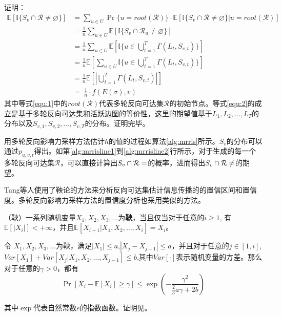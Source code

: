 证明：
\begin{align}
    \mathbb{E}[\mathbb{I}\{S_v\cap \mathcal{R} \ne \varnothing  \}] &=\sum_{u \in U}\Pr\{ u=root(\mathcal{R})\}\cdot \mathbb{E}[\mathbb{I}\{S_v \cap \mathcal{R}\ne\varnothing \}|u=root(\mathcal{R})] \label{equ:1} \\ 
    &= \frac{1}{n}\sum_{u \in U}\mathbb{E}[\mathbb{I}\{S_v \cap \mathcal{R}_u \ne \varnothing \}] \\ 
    &=  \frac{1}{n}\sum_{u \in U}\mathbb{E}\left[\mathbb{I}\{u\in \bigcup_{t=1}^{T}\Gamma(L_t,S_{v,t})\}\right]  \label{equ:2}\\ 
    &= \frac{1}{n} \mathbb{E}\left[\sum_{u \in U}\mathbb{I}\{u\in \bigcup_{t=1}^{T}\Gamma(L_t,S_{v,t})\}\right] \\ 
    &= \frac{1}{n}\mathbb{E}\left[\left|\bigcup_{t=1}^T\Gamma(L_t,S_{v,t})\right|\right] \\ 
    &=\ \frac{1}{n}\cdot f(E(\sigma),v)    
\end{align}
其中等式\ref{equ:1}中的$root(\mathcal{R})$代表多轮反向可达集$\mathcal{R}$的初始节点。等式\ref{equ:2}的成立是基于多轮反向可达集和活跃边图的等价性，这里的期望值基于$L_1,L_2,\ldots, L_T$的分布以及$S_{v,1},S_{v,2},\ldots,S_{v,T}$的分布。证明完毕。

用多轮反向影响力采样方法估计$h$的值的过程如算法\ref{alg:mrris}所示。$S_v$的分布可以通过$p_{u,v,t}$得出。如第\ref{alg:mrrisline1}到\ref{alg:mrrisline2}行所示，对于生成的每一个多轮反向可达集$\mathcal{R}$，可以直接计算出$S_v \cap \mathcal{R} = \empty$的概率，进而得出$S_v \cap \mathcal{R} \neq \empty$的期望。

Tang等人\cite{IMM}使用了鞅论的方法来分析反向可达集估计信息传播的的置信区间和置信度。多轮反向影响力采样方法的置信度分析也采用类似的方法。

\begin{definition}
\label{def:marginal}
（鞅）一系列随机变量$X_1,X_2,X_3,\ldots$为{\bfseries 鞅}，当且仅当对于任意的$i\ge1$, 有$\mathbb{E}[|X_i|]<+\infty$，并且$\mathbb{E}[X_{i+1}|X_1,X_2,\ldots,X_i]=X_i$。
\end{definition}

\begin{lemma}
\label{lem:mar}
令 $X_1,X_2,X_3,\ldots$为鞅，满足$|X_1|\le a$,$|X_j-X_{j-1}|\le a$，并且对于任意的$j\in[1,i]$,$Var[X_1]+Var[X_j|X_1,X_2,\ldots,X_{j-1}]\le b$,其中$Var[\cdot]$表示随机变量的方差。那么对于任意的$\gamma > 0$，都有
\begin{equation}
\Pr\left[X_i-\mathbb{E}[X_i] \ge \gamma\right]\le \exp\left(-\frac{\gamma^2}{\frac{2}{3}a\gamma +2b}\right)
\end{equation}
\end{lemma}
其中$\exp$代表自然常数$e$的指数函数。证明见\parencite{chung2006concentration}。


